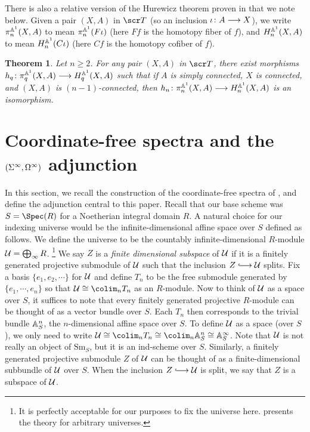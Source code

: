 \documentclass{amsart}
\newtheorem{thm}{Theorem}[section]
\theoremstyle{definition}
\begin{document}
\noindent There is also a relative version of the Hurewicz theorem proven in \cite{shimizu2022rel} that we note below. Given a pair $(X,A)$ in $\sT$ (so an inclusion $\iota \colon A \longrightarrow X$), we write $\pi_n^{\mathbb{A}^1}(X,A)$ to mean $\pi_n^{\mathbb{A}^1}(F\iota)$ (here $Ff$ is the homotopy fiber of $f$), and $H_n^{\mathbb{A}^1}(X,A)$ to mean $H_n^{\mathbb{A}^1}(C\iota)$ (here $Cf$ is the homotopy cofiber of $f$). 
\begin{thm}
Let $n \geq 2$. For any pair $(X,A)$ in $\sT$, there exist morphisms $h_q \colon \pi_q^{\mathbb{A}^1}(X,A) \longrightarrow H_q^{\mathbb{A}^1}(X,A)$ such that if $A$ is simply connected, $X$ is connected, and $(X,A)$ is $(n-1)$-connected, then $h_n \colon \pi_n^{\mathbb{A}^1}(X,A) \longrightarrow H_n^{\mathbb{A}^1}(X,A)$ is an isomorphism.  
\end{thm}

\section{Coordinate-free spectra and the $(\Sigma^{\infty},\Omega^{\infty})$ adjunction}\label{sec:coordfree}
In this section, we recall the construction of the coordinate-free spectra of \cite{Hu03}, and define the adjunction central to this paper. Recall that our base scheme was $S = \Spec(R)$ for a Noetherian integral domain $R$. A natural choice for our indexing universe would be the infinite-dimensional affine space over $S$ defined as follows. We define the universe to be the countably infinite-dimensional $R$-module ${\mathcal{U}} = \bigoplus_{\infty} R$. \footnote{It is perfectly acceptable for our purposes to fix the universe here. \cite{Hu03} presents the theory for arbitrary universes.} We say $Z$ is a \emph{finite dimensional subspace} of ${\mathcal{U}}$ if it is a finitely generated projective submodule of ${\mathcal{U}}$ such that the inclusion $Z \monoto \oU$ splits. Fix a basis $\{e_1, e_2, \cdots\}$ for ${\mathcal{U}}$ and define $T_n$ to be the free submodule generated by $\{e_1, \cdots, e_n\}$ so that $\oU \iso \colim_n T_n$ as an $R$-module. Now to think of ${\mathcal{U}}$ as a space over $S$, it suffices to note that every finitely generated projective $R$-module can be thought of as a vector bundle over $S$. Each $T_n$ then corresponds to the trivial bundle $\mathbb{A}^n_S$, the $n$-dimensional affine space over $S$. To define ${\mathcal{U}}$ as a space (over $S$), we only need to write $\oU \iso \colim_n T_n \iso \colim_n \bA^n_S \iso \bA^{\infty}_S$. Note that ${\mathcal{U}}$ is not really an object of $\mathrm{Sm}_S$, but it is an ind-scheme over $S$. Similarly, a finitely generated projective submodule $Z$ of ${\mathcal{U}}$ can be thought of as a finite-dimensional subbundle of ${\mathcal{U}}$ over $S$. When the inclusion $Z \monoto \oU$ is split, we say that $Z$ is a subspace of ${\mathcal{U}}$.\\
\end{document}

